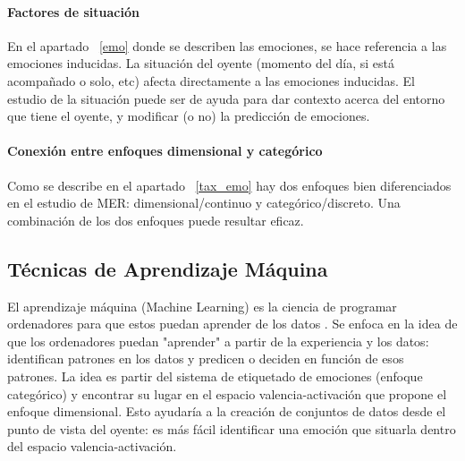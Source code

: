 \documentclass[12pt,a4paper,Spanish]{article}
\begin{document}
\paragraph{Factores de situación}
En el apartado ~\ref{emo} donde se describen las emociones, se hace referencia a las emociones inducidas. La situación del oyente (momento del día, si está acompañado o solo, etc) afecta directamente a las emociones inducidas. El estudio de la situación puede ser de ayuda para dar contexto acerca del entorno que tiene el oyente, y modificar (o no) la predicción de emociones.

\paragraph{Conexión entre enfoques dimensional y categórico}\label{combi}
Como se describe en el apartado ~\ref{tax_emo} hay dos enfoques bien diferenciados en el estudio de MER: dimensional/continuo y categórico/discreto. Una combinación de los dos enfoques puede resultar eficaz.

\subsection{Técnicas de Aprendizaje Máquina}

El aprendizaje máquina (Machine Learning) es la ciencia de programar ordenadores para que estos puedan aprender de los datos \cite{geron2022hands}. Se enfoca en la idea de que los ordenadores puedan "aprender" a partir de la experiencia y los datos: identifican patrones en los datos y predicen o deciden en función de esos patrones. La idea es partir del sistema de etiquetado de emociones (enfoque categórico) y encontrar su lugar en el espacio valencia-activación que propone el enfoque dimensional. Esto ayudaría a la creación de conjuntos de datos desde el punto de vista del oyente: es más fácil identificar una emoción que situarla dentro del espacio valencia-activación.
\end{document}
